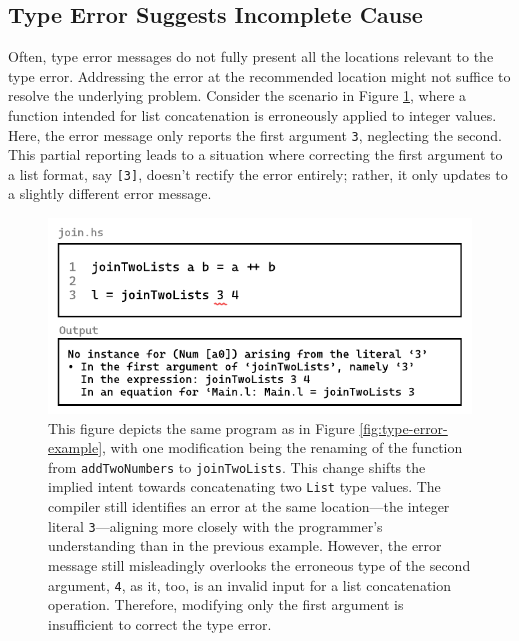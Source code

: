 \subsection{Type Error Suggests Incomplete Cause}
\label{subsec:imcomplete}

Often, type error messages do not fully present all the locations relevant to the type error. Addressing the error at the recommended location might not suffice to resolve the underlying problem. Consider the scenario in Figure \ref{fig:type-error-example-2}, where a function intended for list concatenation is erroneously applied to integer values. Here, the error message only reports the first argument \texttt{3}, neglecting the second. This partial reporting leads to a situation where correcting the first argument to a list format, say \texttt{[3]}, doesn't rectify the error entirely; rather, it only updates to a slightly different error message. 



\begin{figure}[htbp]
    \centering
    \includegraphics[width=\linewidth]{TypeErrorExample2}
  \caption[Illustrating a programming error in Haskell, featuring a function named \texttt{joinTwoLists} with a type error and the corresponding compiler output]{
    \label{fig:type-error-example-2}
    This figure depicts the same program as in Figure \ref{fig:type-error-example}, with one modification being the renaming of the function from \texttt{addTwoNumbers} to \texttt{joinTwoLists}. This change shifts the implied intent towards concatenating two \texttt{List} type values. The compiler still identifies an error at the same location—the integer literal \texttt{3}—aligning more closely with the programmer's understanding than in the previous example. However, the error message still misleadingly overlooks the erroneous type of the second argument, \texttt{4}, as it, too, is an invalid input for a list concatenation operation. Therefore, modifying only the first argument is insufficient to correct the type error.
    }
\end{figure}

